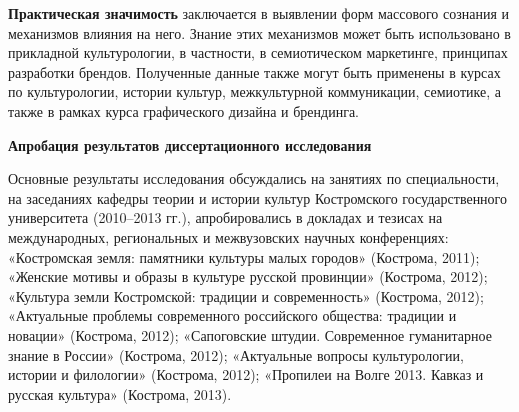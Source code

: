 \textbf{Практическая значимость} заключается в выявлении форм массового сознания и механизмов влияния на него. Знание этих механизмов может быть использовано в прикладной культурологии, в частности, в семиотическом маркетинге, принципах разработки брендов. Полученные данные также могут быть применены в курсах по культурологии, истории культур, межкультурной коммуникации, семиотике, а также в рамках курса графического дизайна и брендинга.

\textbf{Апробация результатов диссертационного исследования}

Основные результаты исследования обсуждались на занятиях по специальности, на заседаниях кафедры теории и истории культур Костромского государственного университета (2010–2013 гг.), апробировались в докладах и тезисах на международных, региональных и межвузовских научных конференциях: «Костромская земля: памятники культуры малых городов» (Кострома, 2011); «Женские мотивы и образы в культуре русской провинции» (Кострома, 2012); «Культура земли Костромской: традиции и современность» (Кострома, 2012); «Актуальные проблемы современного российского общества: традиции и новации» (Кострома, 2012); «Сапоговские штудии. Современное гуманитарное знание в России» (Кострома, 2012); «Актуальные вопросы культурологии, истории и филологии» (Кострома, 2012); «Пропилеи на Волге 2013. Кавказ и русская культура» (Кострома, 2013).

